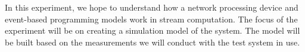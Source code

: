 In this experiment, we hope to understand how a network processing device and event-based programming models work in stream computation. The focus of the experiment will be on creating a simulation model of the system. The model will be built based on the measurements we will conduct with the test system in use.

